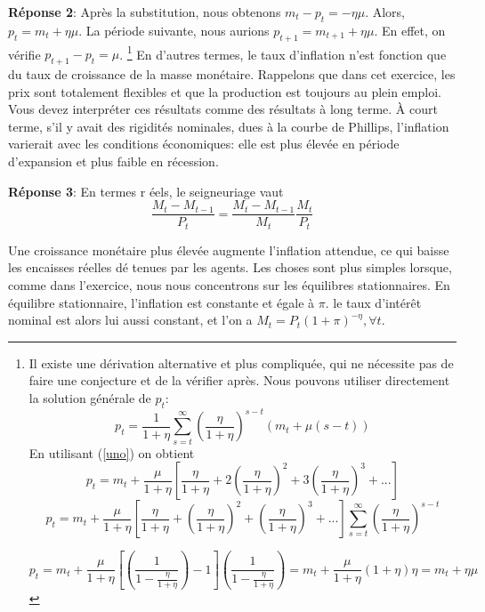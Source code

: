 \documentclass[a4paper,11pt]{article}
\begin{document}
\textbf{Réponse 2}: Après la substitution, nous obtenons $ m_t-p_t = - \eta \mu $. Alors, $ p_t = m_t + \eta \mu $. La période suivante, nous aurions $ p_{t + 1} = m_{t + 1} + \eta \mu $. En effet, on vérifie $ p_{t + 1} -p_t = \mu $. \footnote{Il existe une dérivation alternative et plus compliquée, qui ne nécessite pas de faire une conjecture et de la vérifier après. Nous pouvons utiliser directement la solution générale de  $p_t$: \begin{equation}
p_{t}=\frac{1}{1+\eta} \sum^{\infty}_{s=t} \left(\frac{\eta}{1+\eta}\right)^{s-t} (m_t+\mu(s-t))  
\end{equation} En utilisant (\ref{uno}) on obtient \begin{equation}
p_{t}=m_t + \frac{\mu}{1+\eta} [\frac{\eta}{1+\eta}  + 2 (\frac{\eta}{1+\eta})^2 + 3(\frac{\eta}{1+\eta})^3+... ]  
\end{equation}
\begin{equation}
p_{t}=m_t + \frac{\mu}{1+\eta} \left[\frac{\eta}{1+\eta}  + (\frac{\eta}{1+\eta})^2 + (\frac{\eta}{1+\eta})^3+... \right] \sum^{\infty}_{s=t} \left(\frac{\eta}{1+\eta}\right)^{s-t} 
\end{equation}

\begin{equation}
p_{t}=m_t + \frac{\mu}{1+\eta} \left[\left( \frac{1}{1-\frac{\eta}{1+\eta}} \right)-1 \right] \left( \frac{1}{1-\frac{\eta}{1+\eta}} \right)=m_t+ \frac{\mu}{1+\eta} (1+\eta)\eta=m_t+\eta \mu
\end{equation}
} En d'autres termes, le taux d'inflation n'est fonction que du taux de croissance de la masse monétaire. Rappelons que dans cet exercice, les prix sont totalement flexibles et que la production est toujours au plein emploi. Vous devez interpréter ces résultats comme des résultats à long terme. À court terme, s'il y avait des rigidités nominales, dues à la courbe de Phillips, l'inflation varierait avec les conditions économiques: elle est plus élevée en période d'expansion et plus faible en récession.



\bigskip

\textbf{Réponse 3}: En termes r%
\'{e}els, le seigneuriage vaut 
\begin{equation}
\frac{M_{t}-M_{t-1}}{P_{t}}= \frac{M_{t}-M_{t-1}}{M_{t}} \frac{M_t}{P_t}  \label{ssE78}
\end{equation}

Une croissance monétaire plus élevée augmente l'inflation attendue, ce qui baisse les encaisses r\'{e}elles d\'{e} tenues par les agents.
Les choses sont plus simples lorsque, comme dans l'exercice, nous nous concentrons sur les équilibres stationnaires. En équilibre stationnaire, l'inflation est constante et égale à $\pi$. le taux d'int\'{e}r\^{e}t nominal est alors lui aussi
constant, et l'on a $M_{t}=P_{t}(1+\pi)^{-\eta},\forall t.$  
\end{document}
